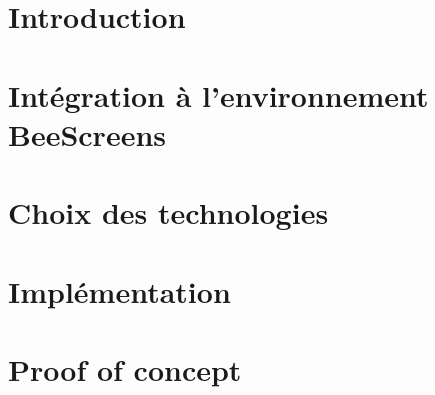 \documentclass[
    iict, %
    il, %
]{heig-tb}
\begin{document}
\maketitle
\frontmatter
\clearemptydoublepage

\preamble
\authentification

%   

\clearemptydoublepage
{
  \tableofcontents
  \let\cleardoublepage\clearpage
  \listoffigures
  \let\cleardoublepage\clearpage
  \listoftables
  \let\cleardoublepage\clearpage
  \listoflistings
}

\printnomenclature
\clearemptydoublepage
{}

\mainmatter
\chapter{Introduction}


\chapter{Intégration à l'environnement BeeScreens}


\chapter{Choix des technologies}


% 

\chapter{Implémentation}
\label{implementation}


\chapter{Proof of concept}


\end{document}
